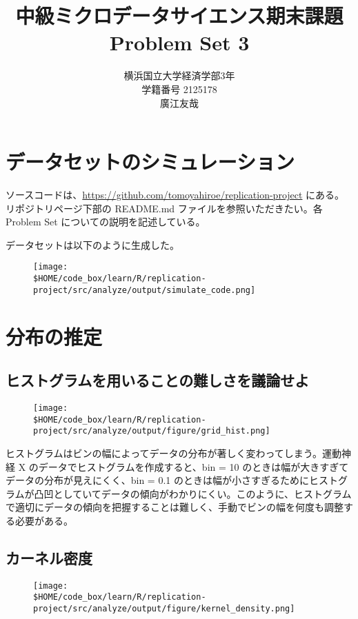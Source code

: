 \documentclass[a4paper]{jsarticle}
\title{中級ミクロデータサイエンス期末課題\\Problem Set 3}
\author{横浜国立大学経済学部3年\\学籍番号 2125178\\廣江友哉}
\begin{document}
\maketitle

\section{データセットのシミュレーション}

ソースコードは、\url{https://github.com/tomoyahiroe/replication-project} にある。リポジトリページ下部の README.md ファイルを参照いただきたい。各Problem Set についての説明を記述している。

データセットは以下のように生成した。

\begin{figure}[H]
  \centering
  \texttt{[image: \\\$HOME/code\_box/learn/R/replication-project/src/analyze/output/simulate\_code.png]}

\end{figure}


\section{分布の推定}

\subsection{ヒストグラムを用いることの難しさを議論せよ}
\begin{figure}[H]
  \centering
  \texttt{[image: \\\$HOME/code\_box/learn/R/replication-project/src/analyze/output/figure/grid\_hist.png]}

\end{figure}

ヒストグラムはビンの幅によってデータの分布が著しく変わってしまう。運動神経 X のデータでヒストグラムを作成すると、bin = 10 のときは幅が大きすぎてデータの分布が見えにくく、bin = 0.1 のときは幅が小さすぎるためにヒストグラムが凸凹としていてデータの傾向がわかりにくい。このように、ヒストグラムで適切にデータの傾向を把握することは難しく、手動でビンの幅を何度も調整する必要がある。

\subsection {カーネル密度}
\begin{figure}[H]
  \centering
  \texttt{[image: \\\$HOME/code\_box/learn/R/replication-project/src/analyze/output/figure/kernel\_density.png]}

\end{figure}
\end{document}
